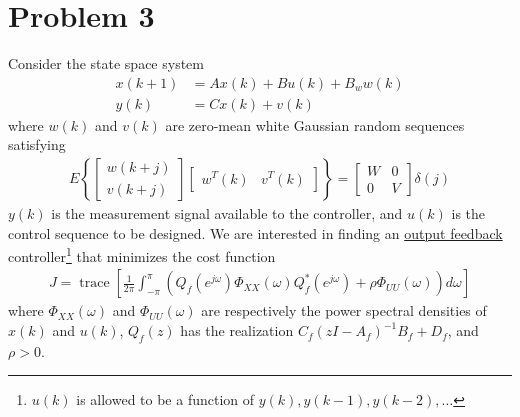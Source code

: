 \section*{Problem 3}

Consider the state space system
\begin{align*}
    x(k+1) & = Ax(k) + Bu(k) + B_w w(k) \\
    y(k) & = Cx(k) + v(k)
\end{align*}
where $w(k)$ and $v(k)$ are zero-mean white Gaussian random sequences satisfying
\begin{align*}
    E \left\{ \begin{bmatrix}
            w(k+j) \\
            v(k+j)
        \end{bmatrix} \begin{bmatrix}
            w^T(k) & v^T(k)
        \end{bmatrix} \right\} = \begin{bmatrix}
            W & 0 \\
            0 & V
        \end{bmatrix} \delta(j)
\end{align*}
$y(k)$ is the measurement signal available to the controller, and $u(k)$ is the control sequence to be designed. We are interested in finding an \underline{output feedback} controller\footnote{$u(k)$ is allowed to be a function of $y(k),y(k-1),y(k-2),\ldots$} that minimizes the cost function
\begin{align*}
    J = \operatorname{trace} \left[ \frac{1}{2\pi} \int_{-\pi}^\pi
        \left( Q_f(e^{j\omega}) \Phi_{XX}(\omega) Q_f^*(e^{j\omega})
        + \rho \Phi_{UU}(\omega) \right) d\omega \right]
\end{align*}
where $\Phi_{XX}(\omega)$ and $\Phi_{UU}(\omega)$ are respectively the power spectral densities of $x(k)$ and $u(k)$, $Q_f(z)$ has the realization $C_f (zI - A_f)^{-1} B_f + D_f$, and $\rho > 0$.

